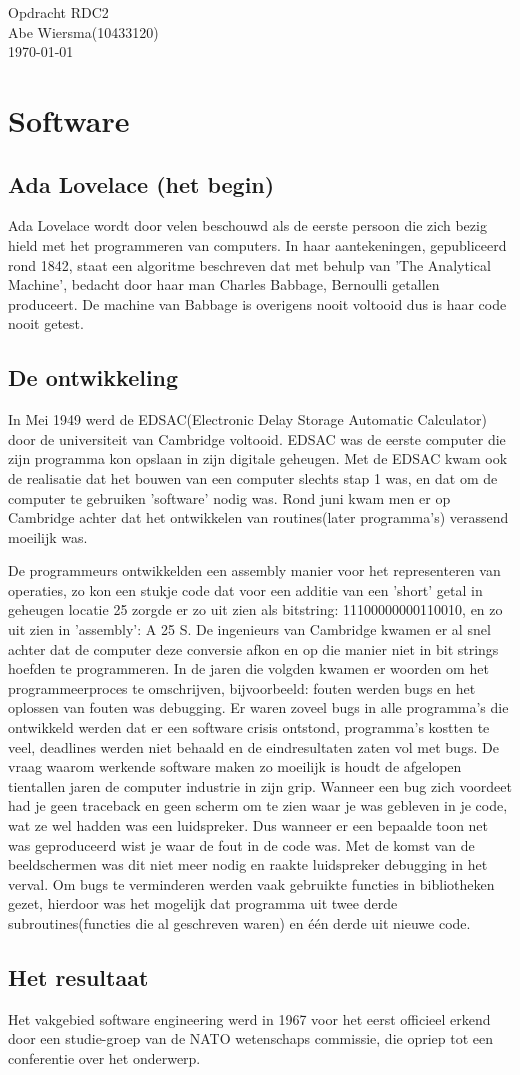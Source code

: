 \documentclass[pdftex,12pt,a4paper]{article}
\begin{document}

\noindent Opdracht RDC2\\ 
Abe Wiersma(10433120)\\
\today
\section*{Software}
\subsection{Ada Lovelace (het begin)}
Ada Lovelace wordt door velen beschouwd als de eerste persoon die zich bezig
hield met het programmeren van computers. In haar aantekeningen, gepubliceerd
rond 1842, staat een algoritme beschreven dat met behulp van
'The Analytical Machine', bedacht door haar man Charles Babbage, Bernoulli
getallen produceert. De machine van Babbage is overigens nooit voltooid dus is
haar code nooit getest.
\subsection{De ontwikkeling}
In Mei 1949 werd de EDSAC(Electronic Delay Storage Automatic Calculator) door
de universiteit van Cambridge voltooid. EDSAC was de eerste computer die zijn
programma kon opslaan in zijn digitale geheugen. Met de EDSAC kwam ook de
realisatie dat het bouwen van een computer slechts stap 1 was, en dat om de
computer te gebruiken 'software' nodig was. Rond juni kwam men er op Cambridge
achter dat het ontwikkelen van routines(later programma's) verassend moeilijk
was. 

De programmeurs ontwikkelden een assembly manier voor het representeren van
operaties, zo kon een stukje code dat voor een additie van een
'short' getal in geheugen locatie 25 zorgde er zo uit zien als bitstring:
11100000000110010, en zo uit zien in 'assembly': A 25 S.\cite{campbell2014history}
De ingenieurs van Cambridge kwamen er al snel achter dat de computer deze
conversie afkon en op die manier niet in bit strings hoefden te programmeren.
In de jaren die volgden kwamen er woorden om het programmeerproces te
omschrijven, bijvoorbeeld: fouten werden bugs en het oplossen van fouten was
debugging. Er waren zoveel bugs in alle programma's die ontwikkeld werden dat
er een software crisis ontstond, programma's kostten te veel, deadlines werden
niet behaald en de eindresultaten zaten vol met bugs. De vraag waarom werkende
software maken zo moeilijk is houdt de afgelopen tientallen jaren de computer
industrie in zijn grip. Wanneer een bug zich voordeet had je geen traceback en
geen scherm om te zien waar je was gebleven in je code, wat ze wel hadden was
een luidspreker. Dus wanneer er een bepaalde toon net was geproduceerd wist je
waar de fout in de code was. Met de komst van de beeldschermen was dit niet meer
nodig en raakte luidspreker debugging in het verval.
Om bugs te verminderen werden vaak gebruikte functies in bibliotheken
gezet, hierdoor was het mogelijk dat programma uit twee derde
subroutines(functies die al geschreven waren) en één derde uit nieuwe code.

\subsection{Het resultaat}
Het vakgebied software engineering werd in 1967 voor het eerst officieel erkend
door een studie-groep van de NATO wetenschaps commissie, die opriep tot een
conferentie over het onderwerp.

\end{document}

